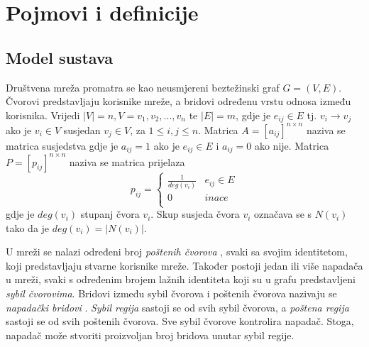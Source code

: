 \documentclass[times, utf8, seminar, numeric]{fer}
\begin{document}
\section{Pojmovi i definicije}

\subsection{Model sustava}
Društvena mreža promatra se kao neusmjereni beztežinski graf $G = (V, E)$. Čvorovi predstavljaju korisnike mreže, a bridovi određenu vrstu odnosa između korisnika. Vrijedi $|V| = n, V = {v_1, v_2, ..., v_n}$ te $|E| = m$, gdje je $e_{ij} \in E$ tj. $v_i \to v_j$ ako je $v_i \in V$ susjedan $v_j \in V$, za $1 \leq i, j \leq n$. Matrica $A = [a_{ij}]^{n \times n}$ naziva se matrica susjedstva gdje je $a_{ij} = 1$ ako je $e_{ij} \in E$ i $a_{ij} = 0$ ako nije. Matrica $P = [p_{ij}]^{n \times n}$ naziva se matrica prijelaza 
\begin{equation} \label{eq:transition}
  p_{ij} = 
  \begin{cases}
    \frac{1}{deg(v_i)} & e_{ij} \in E \\
    0 & inace \\
  \end{cases}
\end{equation}
gdje je $deg(v_i)$ stupanj čvora $v_i$. Skup susjeda čvora $v_i$ označava se s $N(v_i)$ tako da je $deg(v_i) = |N(v_i)|$.

U mreži se nalazi određeni broj \textit{poštenih čvorova} , svaki sa svojim identitetom, koji predstavljaju stvarne korisnike mreže. Također postoji jedan ili više napadača u mreži, svaki s određenim brojem lažnih identiteta koji su u grafu predstavljeni \textit{sybil čvorovima}. Bridovi između sybil čvorova i poštenih čvorova nazivaju se \textit{napadački bridovi} . \textit{Sybil regija}  sastoji se od svih sybil čvorova, a \textit{poštena regija}  sastoji se od svih poštenih čvorova. Sve sybil čvorove kontrolira napadač. Stoga, napadač može stvoriti proizvoljan broj bridova unutar sybil regije.
\end{document}
